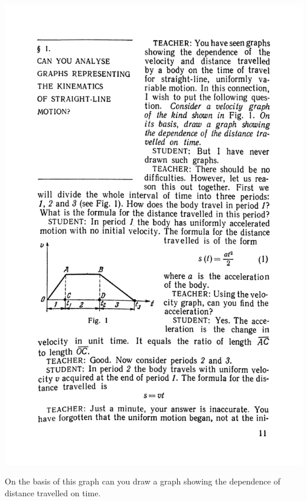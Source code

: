 \documentclass[a4paper,sfsidenotes]{tufte-book}
\begin{document}
\begin{marginfigure}
\centering
\includegraphics[width=1.1\linewidth]{fig-001.pdf}
\caption{On the basis of this graph can you draw a graph showing the dependence of distance travelled on time.}
\label{fig-01}
\end{marginfigure}
\end{document}
